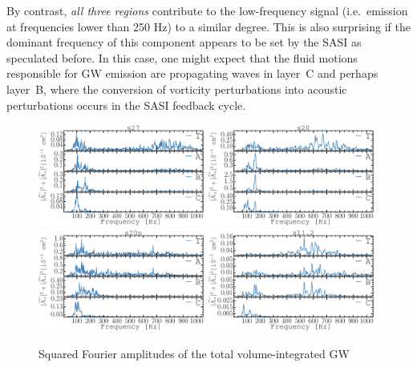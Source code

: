 By contrast, \emph{all three regions} contribute to the low-frequency
signal (i.e.\ emission at frequencies lower than 250 Hz) to a similar degree. This is also surprising
if the dominant frequency of this component appears to be set by the SASI
as speculated before. In this case, one might expect that
the fluid motions responsible for GW emission are propagating
waves in layer~C and perhaps layer~B,
where the conversion of vorticity perturbations into acoustic
perturbations occurs in the SASI feedback cycle. 
\begin{figure}
\includegraphics[width=0.49\textwidth]{./images/chp1/fig6a.pdf}
\includegraphics[width=0.49\textwidth]{./images/chp1/fig6b.pdf}
\\
\includegraphics[width=0.49\textwidth]{./images/chp1/fig6d.pdf}
\includegraphics[width=0.49\textwidth]{./images/chp1/fig6c.pdf}
\caption{Squared Fourier amplitudes of the total volume-integrated GW
}
\end{figure}
